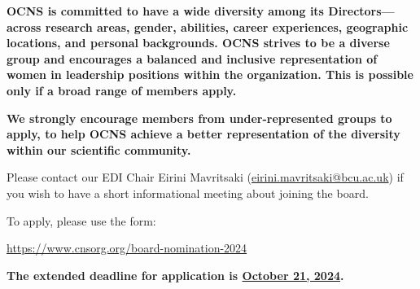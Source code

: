 \begin{tcolorbox}[colback=lighterOrange, colframe=black, width=\textwidth, boxrule=0.1mm]
\textbf{OCNS is committed to have a wide diversity among its Directors---across research areas, gender, abilities, career experiences, geographic locations, and personal backgrounds.
OCNS strives to be a diverse group and encourages a balanced and inclusive representation of women in leadership positions within the organization.
This is possible only if a broad range of members apply.}\\\vspace{1ex}

\textbf{We strongly encourage members from under-represented groups to apply, to help OCNS achieve a better representation of the diversity within our scientific community.}
\end{tcolorbox}

Please contact our EDI Chair Eirini Mavritsaki (\href{mailto:eirini.mavritsaki@bcu.ac.uk}{eirini.mavritsaki@bcu.ac.uk}) if you wish to have a short informational meeting about joining the board.

To apply, please use the form:
\vspace{2ex}
\begin{center}
\url{https://www.cnsorg.org/board-nomination-2024}
\end{center}

\vspace{2ex}
\textbf{The extended deadline for application is \underline{October 21, 2024}.}

\vspace{4ex}
